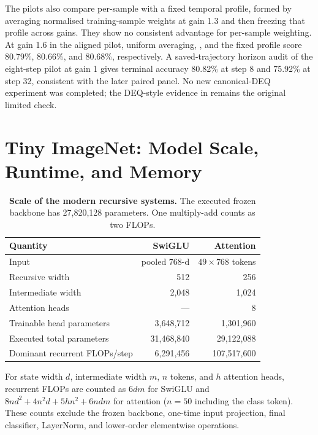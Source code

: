 

The pilots also compare per-sample \grace{} with a fixed temporal profile,
formed by averaging normalised training-sample \grace{} weights at gain 1.3
and then freezing that profile across gains. They show no consistent advantage
for per-sample weighting. At gain 1.6 in the aligned pilot, uniform averaging,
\grace{}, and the fixed profile score 80.79\%, 80.66\%, and 80.68\%,
respectively. A saved-trajectory horizon audit of the eight-step pilot at gain
1 gives terminal accuracy 80.82\% at step 8 and 75.92\% at step 32, consistent
with the later paired panel. No new canonical-DEQ experiment was completed;
the DEQ-style evidence in  remains the original limited check.

\section{Tiny ImageNet: Model Scale, Runtime, and Memory}
\label{app:modern_cost}

\begin{table}[htbp]
\centering
\caption{\textbf{Scale of the modern recursive systems.} The executed frozen
backbone has 27,820,128 parameters. One multiply-add counts as two FLOPs.}
\label{tab:modern_scale}
\small
\begin{tabular}{lrr}
\toprule
Quantity & SwiGLU & Attention \\
\midrule
Input & pooled 768-d & $49\times768$ tokens \\
Recursive width & 512 & 256 \\
Intermediate width & 2,048 & 1,024 \\
Attention heads & --- & 8 \\
Trainable head parameters & 3,648,712 & 1,301,960 \\
Executed total parameters & 31,468,840 & 29,122,088 \\
Dominant recurrent FLOPs/step & 6,291,456 & 107,517,600 \\
\bottomrule
\end{tabular}
\end{table}

For state width $d$, intermediate width $m$, $n$ tokens, and $h$ attention
heads, recurrent FLOPs are counted as $6dm$ for SwiGLU and
$8nd^2+4n^2d+5hn^2+6ndm$ for attention ($n=50$ including the class token).
These counts exclude the frozen backbone, one-time input projection, final
classifier, LayerNorm, and lower-order elementwise operations.

